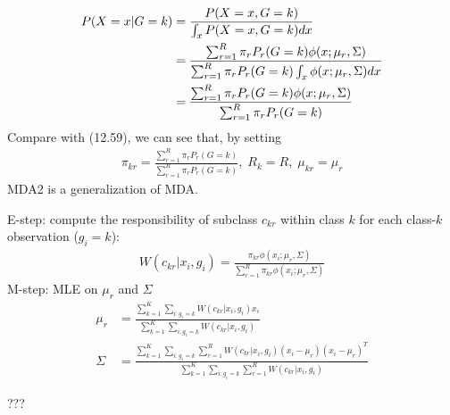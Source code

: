 \begin{exercise}
  \begin{exerciseSection}
    \begin{align}
      P(X=x|G=k) &= \frac{P(X=x,G=k)}{\int_{x}P(X=x,G=k)dx} \notag\\
      &= \frac{\sum_{r = 1}^R\pi_rP_r(G=k)\phi(x;\mu_r,\Sigma)} {\sum_{r =
      1}^R\pi_rP_r(G=k)\int_x\phi(x;\mu_r,\Sigma)dx} \notag\\
      &= \frac{\sum_{r = 1}^R\pi_rP_r(G=k)\phi(x;\mu_r,\Sigma)} {\sum_{r =
      1}^R\pi_rP_r(G=k)}
    \end{align}
    Compare with (12.59), we can see that, by setting
    \begin{align}
      \pi_{kr} = \frac{\sum_{r = 1}^R\pi_rP_r(G=k)} {\sum_{r =
      1}^R\pi_rP_r(G=k)},\; R_k = R,\;\mu_{kr} = \mu_r
    \end{align}
    MDA2 is a generalization of MDA.
  \end{exerciseSection}
  
  \begin{exerciseSection}
    E-step: compute the responsibility of subclass $c_{kr}$ within class $k$ for
    each class-$k$ observation ($g_i=k$):
    \begin{align}
      W(c_{kr}|x_i, g_i) = \frac{\pi_{kr}\phi(x_i;\mu_r,\Sigma)}
      {\sum_{r=1}^R\pi_{kr}\phi(x_i;\mu_r,\Sigma)}
    \end{align}
    M-step: MLE on $\mu_r$ and $\Sigma$
    \begin{align}
      \mu_r &= \frac{\sum_{k = 1}^K\sum_{i:g_i = k}W(c_{kr}|x_i, g_i)x_i} 
      {\sum_{k = 1}^K\sum_{i:g_i = k}W(c_{kr}|x_i, g_i)} \\
      \Sigma &= \frac{\sum_{k = 1}^K \sum_{i:g_i = k} \sum_{r=1}^R W(c_{kr}|x_i,
      g_i)(x_i - \mu_r)(x_i - \mu_r)^T}
      {\sum_{k = 1}^K \sum_{i:g_i = k} \sum_{r=1}^R W(c_{kr}|x_i, g_i)}
    \end{align}
  \end{exerciseSection}
  
  \begin{exerciseSection}
    ???
  \end{exerciseSection}
\end{exercise}